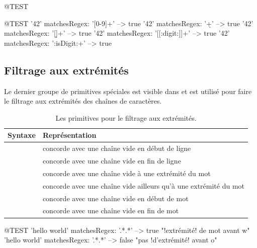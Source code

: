 \documentclass[a4paper,10pt,twoside]{book}
\begin{document}
\begin{code}{@TEST}
\begin{code}{@TEST}
'42' matchesRegex: '[0-9]+'      --> true
'42' matchesRegex: '\d+'           --> true
'42' matchesRegex: '[\d]+'         --> true
'42' matchesRegex: '[[:digit:]]+' --> true
'42' matchesRegex: ':isDigit:+'  --> true
\end{code}

\subsection{Filtrage aux extrémités}
Le dernier groupe de primitives spéciales est visible dans
 et est utilisé pour faire le filtrage aux
extrémités des chaînes de caractères.

\begin{table}[htb]
\centering
	\begin{tabular}{lp{8cm}}
		\toprule
        Syntaxe \pkgregex & Représentation \\
		\midrule
		\lct{\caret} & concorde avec une chaîne vide en début de ligne \\
		\lct{\$} & concorde avec une chaîne vide en fin de ligne \\
		\lct{{\escape}b} & concorde avec une chaîne vide à une extrémité du mot \\
		\lct{{\escape}B} & concorde avec une chaîne vide ailleurs qu'à une extrémité du mot \\
		\lct{{\escape}<} & concorde avec une chaîne vide en début de mot\\
		\lct{{\escape}>} & concorde avec une chaîne vide en fin de mot\\
		\bottomrule
	\end{tabular}
	\caption{Les primitives pour le filtrage aux extrémités.}
\end{table}

\begin{code}{@TEST}
'hello world' matchesRegex: '.*\bw.*' --> true      "!extrémité! de mot avant w"
'hello world' matchesRegex: '.*\bo.*'  --> false    "pas !d'extrémité! avant o"
\end{code}


\end{code}
\end{document}
